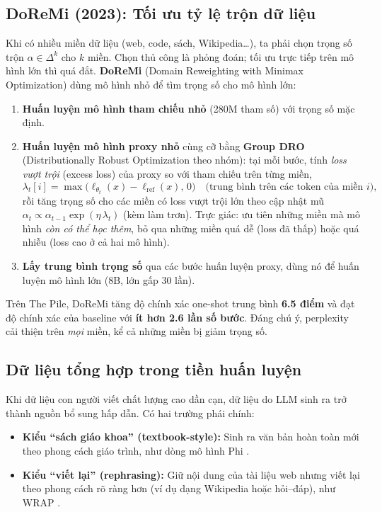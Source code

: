 \subsection{DoReMi (2023): Tối ưu tỷ lệ trộn dữ liệu}
\label{ssec:doremi}
Khi có nhiều miền dữ liệu (web, code, sách, Wikipedia\ldots), ta phải chọn trọng số trộn $\alpha \in \Delta^k$ cho $k$ miền. Chọn thủ công là phỏng đoán; tối ưu trực tiếp trên mô hình lớn thì quá đắt. \textbf{DoReMi} (Domain Reweighting with Minimax Optimization) \cite{xie2023doremi} dùng mô hình nhỏ để tìm trọng số cho mô hình lớn:
\begin{enumerate}
	\item \textbf{Huấn luyện mô hình tham chiếu nhỏ} (280M tham số) với trọng số mặc định.
	\item \textbf{Huấn luyện mô hình proxy nhỏ} cùng cỡ bằng \textbf{Group DRO} (Distributionally Robust Optimization theo nhóm): tại mỗi bước, tính \emph{loss vượt trội} (excess loss) của proxy so với tham chiếu trên từng miền,
	\[
	\lambda_t[i] = \max\Big(\ell_{\theta_t}(x) - \ell_{\text{ref}}(x),\, 0\Big) \quad \text{(trung bình trên các token của miền } i\text{)},
	\]
	rồi tăng trọng số cho các miền có loss vượt trội lớn theo cập nhật mũ $\alpha_t \propto \alpha_{t-1}\exp(\eta\,\lambda_t)$ (kèm làm trơn). Trực giác: ưu tiên những miền mà mô hình \emph{còn có thể học thêm}, bỏ qua những miền quá dễ (loss đã thấp) hoặc quá nhiễu (loss cao ở cả hai mô hình).
	\item \textbf{Lấy trung bình trọng số} qua các bước huấn luyện proxy, dùng nó để huấn luyện mô hình lớn (8B, lớn gấp 30 lần).
\end{enumerate}
Trên The Pile, DoReMi tăng độ chính xác one-shot trung bình \textbf{6.5 điểm} và đạt độ chính xác của baseline với \textbf{ít hơn 2.6 lần số bước}. Đáng chú ý, perplexity cải thiện trên \emph{mọi} miền, kể cả những miền bị giảm trọng số.

\subsection{Dữ liệu tổng hợp trong tiền huấn luyện}
\label{ssec:synthetic_pretraining}
Khi dữ liệu con người viết chất lượng cao dần cạn, dữ liệu do LLM sinh ra trở thành nguồn bổ sung hấp dẫn. Có hai trường phái chính:
\begin{itemize}
	\item \textbf{Kiểu “sách giáo khoa” (textbook-style):} Sinh ra văn bản hoàn toàn mới theo phong cách giáo trình, như dòng mô hình Phi \cite{gunasekar2023textbooks}.
	\item \textbf{Kiểu “viết lại” (rephrasing):} Giữ nội dung của tài liệu web nhưng viết lại theo phong cách rõ ràng hơn (ví dụ dạng Wikipedia hoặc hỏi--đáp), như WRAP \cite{maini2024wrap}.
\end{itemize}

